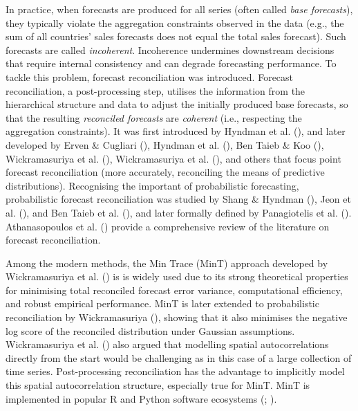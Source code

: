 \documentclass[
  11pt,
  letterpaper,
  DIV=11,
  numbers=noendperiod,
  titlepage]{scrartcl}
\begin{document}
In practice, when forecasts are produced for all series (often called
\emph{base forecasts}), they typically violate the aggregation
constraints observed in the data (e.g., the sum of all countries' sales
forecasts does not equal the total sales forecast). Such forecasts are
called \emph{incoherent}. Incoherence undermines downstream decisions
that require internal consistency and can degrade forecasting
performance. To tackle this problem, forecast reconciliation was
introduced. Forecast reconciliation, a post-processing step, utilises
the information from the hierarchical structure and data to adjust the
initially produced base forecasts, so that the resulting
\emph{reconciled forecasts} are \emph{coherent} (i.e., respecting the
aggregation constraints). It was first introduced by Hyndman et al.
(), and later developed by Erven \&
Cugliari (), Hyndman et al.
(), Ben Taieb \& Koo
(), Wickramasuriya et al.
(), Wickramasuriya et al.
(), and others that focus
point forecast reconciliation (more accurately, reconciling the means of
predictive distributions). Recognising the important of probabilistic
forecasting, probabilistic forecast reconciliation was studied by Shang
\& Hyndman (), Jeon et al.
(), and Ben Taieb et al.
(), and later formally defined by
Panagiotelis et al. ().
Athanasopoulos et al. ()
provide a comprehensive review of the literature on forecast
reconciliation.

Among the modern methods, the Min Trace (MinT) approach developed by
Wickramasuriya et al. () is is
widely used due to its strong theoretical properties for minimising
total reconciled forecast error variance, computational efficiency, and
robust empirical performance. MinT is later extended to probabilistic
reconciliation by Wickramasuriya
(), showing that it also
minimises the negative log score of the reconciled distribution under
Gaussian assumptions. Wickramasuriya et al.
() also argued that modelling
spatial autocorrelations directly from the start would be challenging as
in this case of a large collection of time series. Post-processing
reconciliation has the advantage to implicitly model this spatial
autocorrelation structure, especially true for MinT. MinT is implemented
in popular R and Python software ecosystems
(;
).
\end{document}
